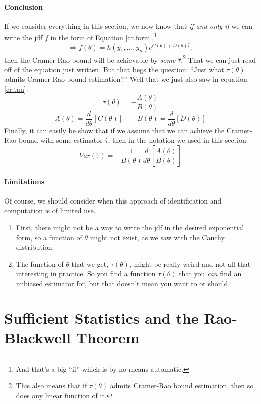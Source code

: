 \documentclass[a4paper,12pt]{scrartcl}
\begin{document}
\newpage
\paragraph{Conclusion} If we consider everything in this
section, we now know that \emph{if and only if} we can write the jdf
$f$ in the form of Equation
\ref{cr.form},\footnote{And that's a big ``if''
which is by no means automatic.}
   \[ \Rightarrow f(\theta) = h(y_1, \ldots, y_n) e^{C(\theta)
      + D(\theta)  \hat{\tau} },  \]
then the Cramer Rao bound will be achievable by \emph{some}
$\hat{\tau}$.\footnote{This also means that if $\tau(\theta)$ admits
Cramer-Rao bound estimation, then so does any linear function of it.}
That we can just read off of the equation just written.
But that begs the question: ``Just what $\tau(\theta)$ admits
Cramer-Rao bound estimation?'' Well that we just also saw in equation
\ref{cr.tau}:
\[ \tau(\theta) = -\frac{A(\theta)}{B(\theta)} \]
\[ A(\theta) = \frac{d}{d\theta}\left[ C(\theta)\right] \qquad
   B(\theta) = \frac{d}{d\theta}\left[ D(\theta)\right] \]
Finally, it can easily be show that if we assume that we can achieve
the Cramer-Rao bound with some estimator $\hat{\tau}$, then in
the notation we used in this section
   \[ Var(\hat{\tau}) = -\frac{1}{B(\theta)} \frac{d}{d\theta} \left[
      \frac{A(\theta)}{B(\theta)}\right] \]

\paragraph{Limitations} Of course, we should consider when this
approach of identification and computation is of limited use.
\begin{enumerate}
   \item First, there might not be a way to write the jdf in the
      desired exponential form, so a function of $\theta$ might not
      exist, as we saw with the Cauchy distribution.
   \item The function of $\theta$ that we get, $\tau(\theta)$, might
      be really weird and not all that interesting in practice. So
      you find a function $\tau(\theta)$ that you \emph{can}
      find an unbiased estimator for, but that doesn't mean you want to
      or should.
\end{enumerate}


\newpage
\section{Sufficient Statistics and the Rao-Blackwell Theorem}
\end{document}
